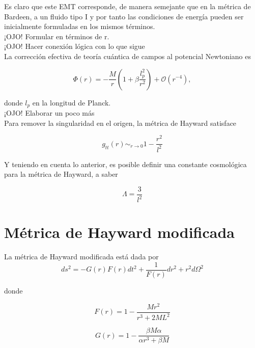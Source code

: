 \documentclass[prb,aps,preprintnumbers,amsmath,amssymb]{article}
\numberwithin{equation}{section}
\begin{document}
Es claro que este EMT corresponde, de manera semejante que en la métrica de Bardeen, a un fluido tipo I y por tanto las condiciones de energía pueden ser inicialmente formuladas en los mismos términos.\\

¡OJO! Formular en términos de r.\\

¡OJO! Hacer conexión lógica con lo que sigue\\

La corrección efectiva de teoría cuántica de campos al potencial Newtoniano es

\begin{equation}
\label{new}
\Phi (r) = -\frac{M}{r} \left( 1 + \beta \frac{l_{p}^2}{r^2} \right) + \mathcal{O}(r^{-4}),
\end{equation}

donde $l_{p}$ en la longitud de Planck.\\

¡OJO! Elaborar un poco más\\

Para remover la singularidad en el origen, la métrica de Hayward satisface 

\begin{equation}
g_{tt}(r) \sim_{r \to 0} 1 - \frac{r^2}{l^2}
\end{equation}

Y teniendo en cuenta lo anterior, es posible definir una constante cosmológica para la métrica de Hayward, a saber

\begin{equation}
\Lambda = \frac{3}{l^2}
\end{equation}

\section{Métrica de Hayward modificada}

La métrica de Hayward modificada está dada por 
\begin{equation}
\label{reg-sch}
ds^2 = -G(r)F(r) dt^2 + \frac{1}{F(r)} dr^2 + r^2d\Omega ^2
\end{equation}

donde

\begin{equation}
\label{mod-hay-f}
F(r) = 1 - \frac{Mr^2}{r^3 + 2ML^2}
\end{equation}

\begin{equation}
\label{mod-hay-g}
G(r) = 1 - \frac{\beta M \alpha}{\alpha r^3 + \beta M}
\end{equation}
\end{document}
